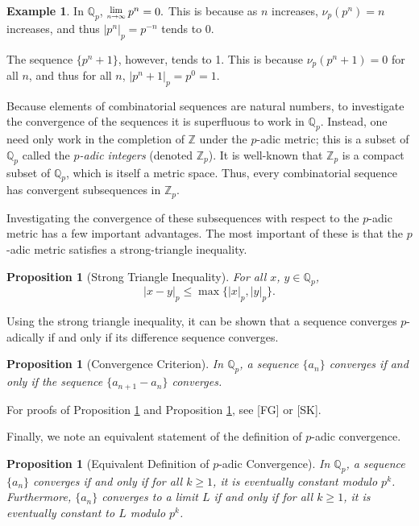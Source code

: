 \documentclass[12pt, letter]{article}    %
\theoremstyle{plain}
\newtheorem{proposition}[theorem]{Proposition}
\theoremstyle{definition}
\newtheorem{example}[theorem]{Example}
\numberwithin{equation}{section}
\newcommand{\rationals}{\mathbb{Q}}
\newcommand{\Lim}[1]{\raisebox{0.5ex}{\scalebox{0.8}{$\displaystyle \lim_{#1}\;$}}}
\newcommand{\integers}{\mathbb{Z}}
\newcommand{\propref}[1]{Proposition \ref{#1}}
\newcommand{\fcite}[1]{[#1]}
\newcommand{\thlabel}[1]{\label{#1}}
\begin{document}
\begin{example} In $\mathbb{Q}_p$, $\Lim{n\rightarrow\infty}p^n=0.$ This is because as $n$ increases, $\nu_p(p^n)=n$ increases, and thus $|p^n|_p=p^{-n}$ tends to 0.

The sequence $\{p^n+1\}$, however, tends to 1. This is because $\nu_p(p^n+1)=0$ for all $n$, and thus for all $n$, $|p^n+1|_p=p^{0}=1$.
\end{example}


\noindent Because elements of combinatorial sequences are natural numbers, to investigate the convergence of the sequences it is superfluous to work in $\rationals_p$. Instead, one need only work in the completion of $\integers$ under the $p$-adic metric; this is a subset of $\rationals_p$ called the \textit{$p$-adic integers} (denoted $\mathbb{Z}_p$). It is well-known that $\integers_p$ is a compact subset of $\rationals_p$, which is itself a metric space. Thus, every combinatorial sequence has convergent subsequences in $\integers_p$.

Investigating the convergence of these subsequences with respect to the $p$-adic metric has a few important advantages. The most important of these is that the $p$-adic metric satisfies a strong-triangle inequality.

\begin{proposition}[Strong Triangle Inequality]\thlabel{triangle}
For all $x$, $y\in\rationals_p$, 
$$|x-y|_p\leq\max\{|x|_p,|y|_p\}.$$
\end{proposition}

\noindent Using the strong triangle inequality, it can be shown that a sequence converges $p$-adically if and only if its difference sequence converges.

\begin{proposition}[Convergence Criterion]
\thlabel{conv crit}
In $\rationals_p$, a sequence $\{a_n\}$ converges if and only if the sequence $\{a_{n+1}-a_n\}$ converges.
\end{proposition}

\noindent For proofs of \propref{triangle} and \propref{conv crit}, see \fcite{FG} or \fcite{SK}. 

Finally, we note an equivalent statement of the definition of $p$-adic convergence.

\begin{proposition}[Equivalent Definition of $p$-adic Convergence]\thlabel{eq def}
In $\rationals_p$, a sequence $\{a_n\}$ converges if and only if for all $k\geq1$, it is eventually constant modulo $p^k$. Furthermore, $\{a_n\}$ converges to a limit $L$ if and only if for all $k\geq1$, it is eventually constant to $L$ modulo $p^k$.
\end{proposition}
\end{document}
